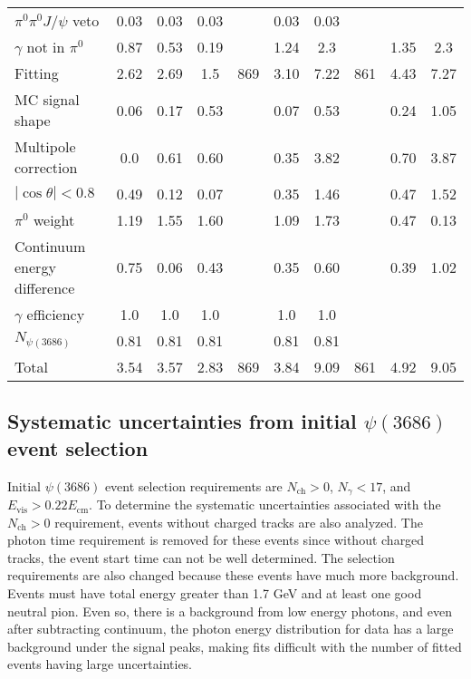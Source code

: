 \documentclass[aps,prd,twocolumn,showpacs,floatfix,byrevtex]{revtex4-1}
\newcommand\T{\rule{0pt}{2.6ex}}       %
\newcommand\B{\rule[-1.2ex]{0pt}{0pt}} %
\begin{document}
\begin{table*}[tb]
\begin{tabular}{l|ccc|ccc|ccc}
  $\pi^0 \pi^0 J/\psi$ veto & 0.03 &0.03 &0.03 &   &0.03 &0.03 & & &\\
  $\gamma$ not in $\pi^0$ & 0.87& 0.53& 0.19&  & 1.24 & 2.3 &  &1.35 & 2.3 \\
  Fitting & 2.62 &2.69 &1.5 & 869 &3.10 &7.22 & 861 & 4.43& 7.27\\
  MC signal shape  & 0.06 & 0.17 & 0.53 &  & 0.07 & 0.53 &
   &  0.24 & 1.05 \\
Multipole correction &  0.0 & 0.61 & 0.60 & &0.35 &3.82 & &0.70 & 3.87  \\  
  $|\cos \theta| < 0.8$ & 0.49 & 0.12  & 0.07 &  & 0.35 & 1.46 &  &0.47 & 1.52 \\
 $\pi^0$ weight &1.19 &1.55 & 1.60 &  &1.09 &1.73 &  &0.47 &
  0.13\\ 
Continuum energy difference & 0.75 & 0.06 & 0.43 & & 0.35 & 0.60 &
& 0.39 & 1.02\\ 
  $\gamma$ efficiency &1.0 &1.0 &1.0 &  & 1.0& 1.0& & & \\
  $N_{\psi(3686)}$ &0.81 &0.81 &0.81 &  & 0.81&0.81 & & & \B \\ \hline
 \T Total &3.54 &3.57 &2.83 & 869 & 3.84  &9.09 & 861 & 4.92 &9.05 \B \\  
  \hline \hline
\end{tabular}
\label{systematics}
\end{table*}

\subsection{\boldmath Systematic uncertainties from initial $\psi(3686)$ event selection}
\label{systematic1}
Initial $\psi(3686)$ event selection requirements are $N_{\text{ch}} > 0$,
$N_{\gamma} < 17$, and $E_{\text{vis}} > 0.22  E_{\text{cm}}$.
To determine the systematic uncertainties associated with the $N_{\text{ch}} > 0$
requirement, events without charged tracks are also analyzed.  The
photon time requirement is removed for these events since without
charged tracks, the event start time can not be well determined. The selection
requirements are also changed because these events have much more
background.  Events must have total energy greater than 1.7 GeV and at
least one good neutral pion.  Even so, there is a background from low
energy photons, and even after subtracting continuum, the
photon energy distribution for data has a large background under the
signal peaks, making fits difficult with the number of fitted events
having large uncertainties.
\end{document}
